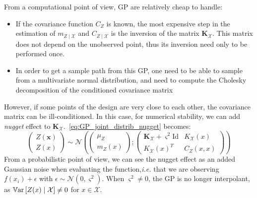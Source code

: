 \documentclass[../../Main_ManuscritThese.tex]{subfiles}
\begin{document}
From a computational point of view, GP are relatively cheap to handle:
\begin{itemize}
\item If the covariance function $C_Z$ is known, the most expensive step in the estimation of $m_{Z\mid \mathcal{X}}$ and $C_{Z \mid \mathcal{X}}$ is the inversion of the matrix $\mathbf{K}_{\mathcal{X}}$. This matrix does not depend on the unobserved point, thus its inversion need only to be performed once.
\item In order to get a sample path from this GP, one need to be able to sample from a multivariate normal distribution, and need to compute the Cholesky decomposition of the conditioned covariance matrix
\end{itemize}
However, if some points of the design are very close to each other, the covariance matrix can be ill-conditioned. In this case,
for numerical stability, we can add \emph{nugget} effect to $\mathbf{K}_{\mathcal{X}}$.~\eqref{eq:GP_joint_distrib_nugget} becomes:
\begin{equation}
  \label{eq:GP_joint_distrib_nugget}
  \begin{pmatrix}
    Z(\mathbf{x}) \\
    Z(x)
  \end{pmatrix} \sim
  \mathcal{N}\left(
    \begin{pmatrix}
      \mu_Z \\
      m_{Z}(x)
    \end{pmatrix} ;
    \begin{pmatrix}
      \mathbf{K}_{\mathcal{X}} + \varsigma^2\mathrm{Id}& K_{\mathcal{X}}(x) \\
       K_{\mathcal{X}}(x)^T & C_Z(x, x)
    \end{pmatrix}
\right)
\end{equation}
From a probabilistic point of view, we can see the nugget effect as an added Gaussian noise when evaluating the function,\emph{i.e.} that we are observing $f(x_i)+\epsilon$ with $\epsilon \sim \mathcal{N}(0, \varsigma^2)$. When $\varsigma^2 \neq 0$, the GP is no longer interpolant, as $\mathbb{V}\mathrm{ar}\left[Z(x) \mid \mathcal{X}\right] \neq 0$ for $x\in \mathcal{X}$.
\end{document}
